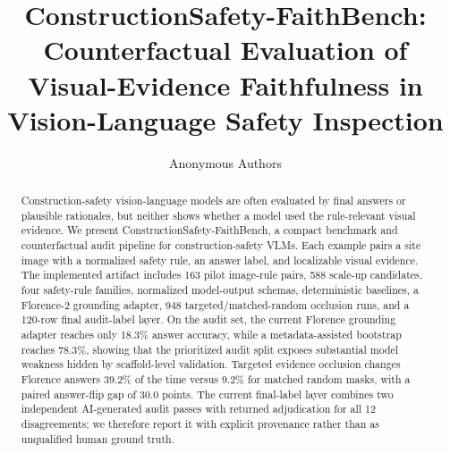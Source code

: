 \documentclass[11pt]{article}
\title{ConstructionSafety-FaithBench: Counterfactual Evaluation of Visual-Evidence Faithfulness in Vision-Language Safety Inspection}
\author{Anonymous Authors}
\date{}
\begin{document}
\maketitle

\begin{abstract}
Construction-safety vision-language models are often evaluated by final answers or plausible rationales, but neither shows whether a model used the rule-relevant visual evidence. We present ConstructionSafety-FaithBench, a compact benchmark and counterfactual audit pipeline for construction-safety VLMs. Each example pairs a site image with a normalized safety rule, an answer label, and localizable visual evidence. The implemented artifact includes 163 pilot image-rule pairs, 588 scale-up candidates, four safety-rule families, normalized model-output schemas, deterministic baselines, a Florence-2 grounding adapter, 948 targeted/matched-random occlusion runs, and a 120-row final audit-label layer. On the audit set, the current Florence grounding adapter reaches only 18.3\% answer accuracy, while a metadata-assisted bootstrap reaches 78.3\%, showing that the prioritized audit split exposes substantial model weakness hidden by scaffold-level validation. Targeted evidence occlusion changes Florence answers 39.2\% of the time versus 9.2\% for matched random masks, with a paired answer-flip gap of 30.0 points. The current final-label layer combines two independent AI-generated audit passes with returned adjudication for all 12 disagreements; we therefore report it with explicit provenance rather than as unqualified human ground truth.
\end{abstract}









\clearpage



\appendix

\end{document}
